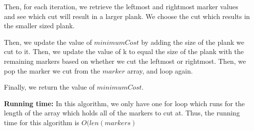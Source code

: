 \documentclass[letterpaper,11pt]{article}
\begin{document}
Then, for each iteration, we retrieve the leftmost and rightmost marker values and see which cut will result in a larger plank. We choose the cut which results in the smaller sized plank. 

Then, we update the value of $minimumCost$ by adding the size of the plank we cut to it. Then, we update the value of k to equal the size of the plank with the remaining markers based on whether we cut the leftmost or rightmost. Then, we pop the marker we cut from the $marker$ array, and loop again.

Finally, we return the value of $minimumCost$.

{\bf Running time: } In this algorithm, we only have one for loop which runs for the length of the array which holds all of the markers to cut at. Thus, the running time for this algorithm is $O(len(markers)$
\end{document}
